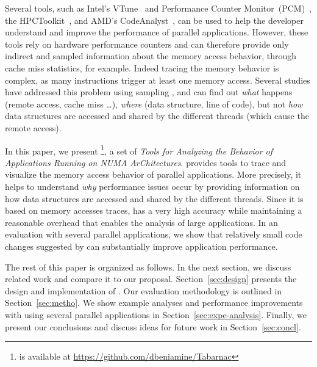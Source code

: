 Several tools, such as Intel's VTune~\cite{Reinders05VTune} and Performance Counter Monitor~(PCM)~\cite{Intel2012b}, the HPCToolkit~\cite{Adhianto10HPCTOOLKIT}, and AMD's CodeAnalyst~\cite{Drongowski2008}, can be used to help the
developer understand and improve the performance of parallel applications.
However, these tools rely on hardware performance counters and can therefore provide only indirect and sampled information about the memory access behavior, through cache miss statistics, for example.
Indeed tracing the memory behavior is complex, as many instructions trigger at least one memory access.
Several studies have addressed this problem using sampling
\cite{Lachaize12MemProf,McCurdy2010,Gimenez14Dissecting},
and can find out \emph{what} happens (remote access, cache miss \ldots),
\emph{where} (data structure, line of code), but not \emph{how} data structures are
accessed and shared by the different threads (which cause the remote access).

In this paper, we present \TABARNAC\footnote{\TABARNAC is available at
    \url{https://github.com/dbeniamine/Tabarnac}}, a set of \emph{Tools for
        Analyzing the Behavior of
Applications Running on NUMA ArChitectures}. \TABARNAC provides tools to trace
and visualize the memory access behavior of parallel
applications. More precisely, it helps to understand \emph{why} performance
issues occur by providing information on how data structures are accessed and
shared by the
different threads.
Since it is based on memory accesses traces, \TABARNAC has a very high
accuracy while maintaining a reasonable overhead that enables the analysis of large applications.
In an evaluation with several parallel applications, we show that relatively small code changes suggested by \TABARNAC can substantially improve application performance.

The rest of this paper is organized as follows.
In the next section, we discuss related work and compare it to our proposal.
Section~\ref{sec:design} presents the design and implementation of \TABARNAC.
Our evaluation methodology is outlined in Section~\ref{sec:metho}.
We show example analyses and performance improvements with \TABARNAC using several parallel applications in Section~\ref{sec:expe-analysis}.
Finally, we present our conclusions and discuss ideas for future work in Section~\ref{sec:concl}.
